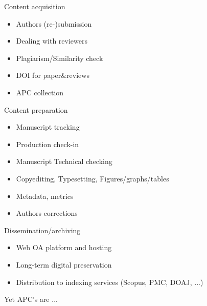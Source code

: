 \documentclass[10pt,compress,serif,aspectratio=169]{beamer}
\begin{document}
\begin{frame}[t]%
 \vskip1cm%

 \begin{minipage}{.45\textwidth}
   Content acquisition
   \begin{itemize}
   \item Authors (re-)submission
   \item Dealing with reviewers
   \item Plagiarism/Similarity check
   \item DOI for paper\&reviews
   \item APC collection
   \end{itemize}
 \end{minipage}
 \hfill
   \pause
 \begin{minipage}{.45\textwidth}
   Content preparation
   \begin{itemize}
   \item Manuscript tracking
   \item Production check-in
   \item Manuscript Technical checking
   \item Copyediting, Typesetting, Figures/graphs/tables
   \item Metadata, metrics
   \item Authors corrections
   \end{itemize}
\end{minipage}
\vfill
\pause
\begin{center}
 \begin{minipage}{.7\textwidth}
  Dissemination/archiving
  \begin{itemize}
  \item Web OA platform and hosting
  \item Long-term digital preservation
  \item Distribution to indexing services (Scopus, PMC, DOAJ, ...)
  \end{itemize}
\end{minipage}
\end{center}
\end{frame}


\begin{frame}[t]%
 \vskip1cm%

 \begin{center}
 \alert{\Large Yet APC's are ...}\\
 \end{center}

 \pause
\end{frame}
\end{document}
